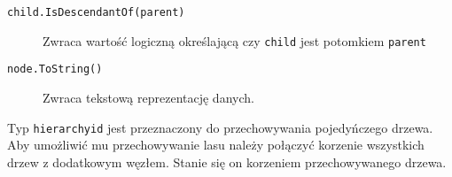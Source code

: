 \begin{description}



  \item[\texttt{child.IsDescendantOf(parent)}]
  	Zwraca wartość logiczną określającą czy \texttt{child} jest potomkiem \texttt{parent}




  \item[\texttt{node.ToString()}] 
  	Zwraca tekstową reprezentację danych.



 \end{description}



Typ \texttt{hierarchyid} jest przeznaczony do przechowywania pojedyńczego drzewa.
Aby umożliwić mu przechowywanie lasu należy połączyć korzenie wszystkich drzew z dodatkowym węzłem.
Stanie się on korzeniem przechowywanego drzewa.

